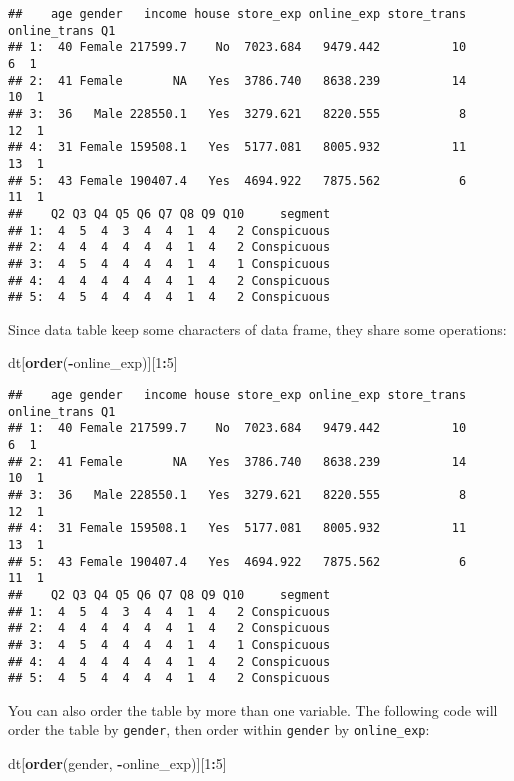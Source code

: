 \documentclass[
]{article}
\newenvironment{Shaded}{\begin{snugshade}}{\end{snugshade}}
\newcommand{\DecValTok}[1]{\textcolor[rgb]{0.00,0.00,0.81}{#1}}
\newcommand{\KeywordTok}[1]{\textcolor[rgb]{0.13,0.29,0.53}{\textbf{#1}}}
\newcommand{\NormalTok}[1]{#1}
\newcommand{\OperatorTok}[1]{\textcolor[rgb]{0.81,0.36,0.00}{\textbf{#1}}}
\begin{document}
\begin{verbatim}
##    age gender   income house store_exp online_exp store_trans online_trans Q1
## 1:  40 Female 217599.7    No  7023.684   9479.442          10            6  1
## 2:  41 Female       NA   Yes  3786.740   8638.239          14           10  1
## 3:  36   Male 228550.1   Yes  3279.621   8220.555           8           12  1
## 4:  31 Female 159508.1   Yes  5177.081   8005.932          11           13  1
## 5:  43 Female 190407.4   Yes  4694.922   7875.562           6           11  1
##    Q2 Q3 Q4 Q5 Q6 Q7 Q8 Q9 Q10     segment
## 1:  4  5  4  3  4  4  1  4   2 Conspicuous
## 2:  4  4  4  4  4  4  1  4   2 Conspicuous
## 3:  4  5  4  4  4  4  1  4   1 Conspicuous
## 4:  4  4  4  4  4  4  1  4   2 Conspicuous
## 5:  4  5  4  4  4  4  1  4   2 Conspicuous
\end{verbatim}

Since data table keep some characters of data frame, they share some
operations:

\begin{Shaded}
\begin{Highlighting}[]
\NormalTok{dt[}\KeywordTok{order}\NormalTok{(}\OperatorTok{-}\NormalTok{online_exp)][}\DecValTok{1}\OperatorTok{:}\DecValTok{5}\NormalTok{]}
\end{Highlighting}
\end{Shaded}

\begin{verbatim}
##    age gender   income house store_exp online_exp store_trans online_trans Q1
## 1:  40 Female 217599.7    No  7023.684   9479.442          10            6  1
## 2:  41 Female       NA   Yes  3786.740   8638.239          14           10  1
## 3:  36   Male 228550.1   Yes  3279.621   8220.555           8           12  1
## 4:  31 Female 159508.1   Yes  5177.081   8005.932          11           13  1
## 5:  43 Female 190407.4   Yes  4694.922   7875.562           6           11  1
##    Q2 Q3 Q4 Q5 Q6 Q7 Q8 Q9 Q10     segment
## 1:  4  5  4  3  4  4  1  4   2 Conspicuous
## 2:  4  4  4  4  4  4  1  4   2 Conspicuous
## 3:  4  5  4  4  4  4  1  4   1 Conspicuous
## 4:  4  4  4  4  4  4  1  4   2 Conspicuous
## 5:  4  5  4  4  4  4  1  4   2 Conspicuous
\end{verbatim}

You can also order the table by more than one variable. The following
code will order the table by \texttt{gender}, then order within
\texttt{gender} by \texttt{online\_exp}:

\begin{Shaded}
\begin{Highlighting}[]
\NormalTok{dt[}\KeywordTok{order}\NormalTok{(gender, }\OperatorTok{-}\NormalTok{online_exp)][}\DecValTok{1}\OperatorTok{:}\DecValTok{5}\NormalTok{]}
\end{Highlighting}
\end{Shaded}
\end{document}
